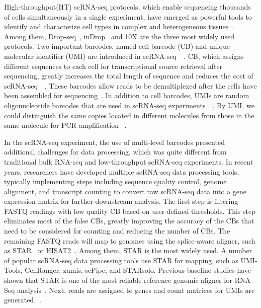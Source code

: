 \documentclass[10pt,journal,compsoc]{IEEEtran}
\begin{document}
High-throughput(HT) scRNA-seq protocols, which enable sequencing thousands of cells simultaneously in a single experiment, have emerged as powerful tools to identify and characterize cell types in complex and heterogeneous tissues~\cite{Zhang2019ComparativeAO}.
Among them, Drop-seq~\cite{Macosko2015HighlyPG}, inDrop~\cite{Klein2015DropletBF} and 10X\cite{Zheng2017Massively} are the three most widely used protocols. 
Two important barcodes, named cell barcode (CB) and unique molecular identifier (UMI) are introduced in scRNA-seq~\cite{Rosenberg2018SinglecellPO}~\cite{Cao2017ComprehensiveSC}. 
CB, which assigns different sequences to each cell for transcriptional source retrieval after sequencing, greatly increases the total length of sequence and reduces the cost of scRNA-seq~\cite{Macosko2015HighlyPG}~\cite{Klein2015DropletBF}. 
These barcodes allow reads to be demultiplexed after the cells have been assembled for sequencing~\cite{Tian2018scPipe}.
In addition to cell barcodes, UMIs are random oligonucleotide barcodes that are used in scRNA-seq experiments~\cite{Kivioja2012Counting}~\cite{Camara2017Methods}.
By UMI, we could distinguish the same copies located in different molecules from those in the same molecule for PCR amplification ~\cite{Smith2017UMItools}.

In the scRNA-seq experiment, the use of multi-level barcodes presented additional challenges for data processing, which was quite different from traditional bulk RNA-seq and low-throughput scRNA-seq experiments. 
In recent years, researchers have developed multiple scRNA-seq data processing tools, typically implementing steps including sequence quality control, genome alignment, and transcript counting to convert raw scRNA-seq data into a gene expression matrix for further downstream analysis. 
The first step is filtering FASTQ readings with low quality CB based on user-defined thresholds. 
This step eliminates most of the false CBs, greatly improving the accuracy of the CBs that need to be considered for counting and reducing the number of CBs. 
The remaining FASTQ reads will map to genomes using the splice-aware aligner, such as STAR~\cite{Dobin2013STAR} or HISAT2~\cite{Kim2015HISAT}. 
Among them, STAR is the most widely used. A number of popular scRNA-seq data processing tools use STAR for mapping, such as UMI-Tools, CellRanger, zumis, scPipe, and STARsolo. 
Previous baseline studies have shown that STAR is one of the most reliable reference genomic aligner for RNA-Seq analysis~\cite{Baruzzo2017SimulationbasedCB}. 
Next, reads are assigned to genes and count matrices for UMIs are generated.~\cite{Parekh2018zUMIs}. 
\end{document}
